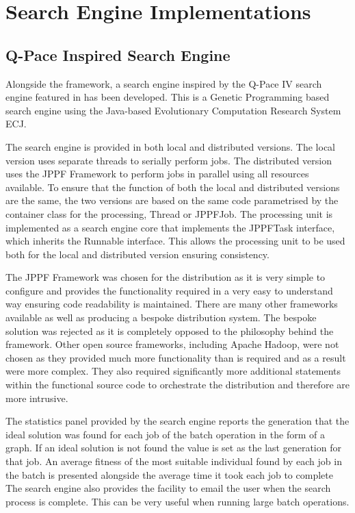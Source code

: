 \section{Search Engine Implementations}
\label{sec:provsearcheng}
\subsection{Q-Pace Inspired Search Engine}
Alongside the framework, a search engine inspired by the Q-Pace IV search engine featured in \cite{masseythesis} has been developed.
This is a Genetic Programming based search engine using the Java-based Evolutionary Computation Research System ECJ\cite{ecjtool}.

The search engine is provided in both local and distributed versions.
The local version uses separate threads to serially perform jobs.
The distributed version uses the JPPF Framework\cite{jppfweb} to perform jobs in parallel using all resources available.
To ensure that the function of both the local and distributed versions are the same, the two versions are based on the same code parametrised by the container class for the processing, Thread or JPPFJob.
The processing unit is implemented as a search engine core that implements the JPPFTask interface, which inherits the Runnable interface.
This allows the processing unit to be used both for the local and distributed version ensuring consistency.

The JPPF Framework was chosen for the distribution as it is very simple to configure and provides the functionality required in a very easy to understand way ensuring code readability is maintained.
There are many other frameworks available as well as producing a bespoke distribution system.
The bespoke solution was rejected as it is completely opposed to the philosophy behind the framework.
Other open source frameworks, including Apache Hadoop\cite{apahadoop}, were not chosen as they provided much more functionality than is required and as a result were more complex.
They also required significantly more additional statements within the functional source code to orchestrate the distribution and therefore are more intrusive.

The statistics panel provided by the search engine reports the generation that the ideal solution was found for each job of the batch operation in the form of a graph.
If an ideal solution is not found the value is set as the last generation for that job.
An average fitness of the most suitable individual found by each job in the batch is presented alongside the average time it took each job to complete
The search engine also provides the facility to email the user when the search process is complete.
This can be very useful when running large batch operations.


